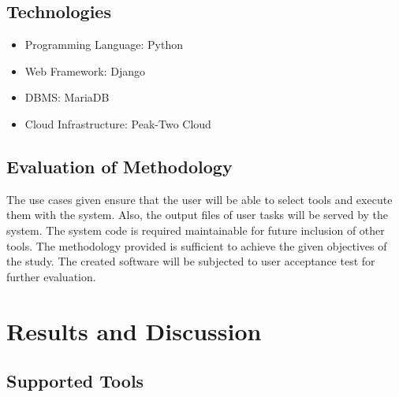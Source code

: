 	
		\subsection{Technologies}
		\begin{itemize}
   			\item Programming Language: Python 
   			\item Web Framework: Django  
   			\item DBMS: MariaDB  
   			\item Cloud Infrastructure: Peak-Two Cloud 
		\end{itemize}	
	
    \subsection {Evaluation of Methodology}
    	The use cases given ensure that the user will be able to select tools and execute them with the system. Also, the output files of user tasks will be served by the system. The system code is required maintainable for future inclusion of other tools.  
        The methodology provided is sufficient to achieve the given objectives of the study. The created software will be subjected to user acceptance test for further evaluation. 

\section{Results and Discussion}
	\subsection{Supported Tools}
		
